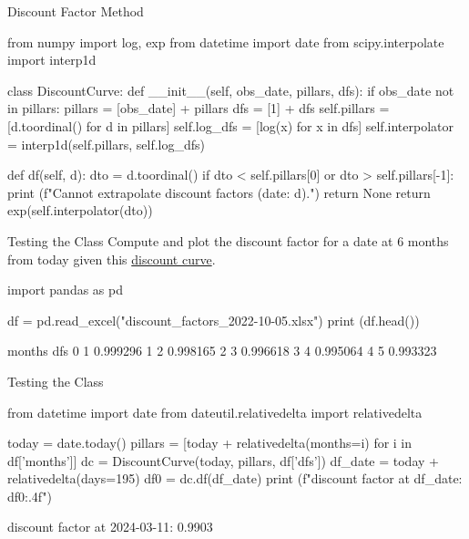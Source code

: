\documentclass{beamer}
\begin{document}
\begin{frame}[fragile]{Discount Factor Method}
\begin{ipython}
from numpy import log, exp
from datetime import date
from scipy.interpolate import interp1d  
	
class DiscountCurve:
    def __init__(self, obs_date, pillars, dfs):
        if obs_date not in pillars:
            pillars = [obs_date] + pillars
            dfs = [1] + dfs
        self.pillars = [d.toordinal() for d in pillars]
        self.log_dfs = [log(x) for x in dfs]
        self.interpolator = interp1d(self.pillars, self.log_dfs)
        
    def df(self, d):
        dto = d.toordinal()   
        if dto < self.pillars[0] or dto > self.pillars[-1]:
            print (f"Cannot extrapolate discount factors (date: {d}).")
            return None
        return exp(self.interpolator(dto))
\end{ipython}
\end{frame}

\begin{frame}[fragile]{Testing the Class}
Compute and plot the discount factor for a date at 6 months from today given this \href{https://github.com/matteosan1/finance_course/raw/develop/input_files/discount_factors_2022-10-05.xlsx}{discount curve}.
\begin{ipython}
import pandas as pd

df = pd.read_excel("discount_factors_2022-10-05.xlsx")
print (df.head())
\end{ipython}
\begin{ioutput}
   months       dfs
0       1  0.999296
1       2  0.998165
2       3  0.996618
3       4  0.995064
4       5  0.993323
\end{ioutput}
\end{frame}

\begin{frame}[fragile]{Testing the Class}
\begin{ipython}
from datetime import date
from dateutil.relativedelta import relativedelta

today = date.today()
pillars = [today + relativedelta(months=i) for i in df['months']]
dc = DiscountCurve(today, pillars, df['dfs'])
df_date = today + relativedelta(days=195)
df0 = dc.df(df_date)
print (f"discount factor at {df_date}: {df0:.4f}")
\end{ipython}
\begin{ioutput}
discount factor at 2024-03-11: 0.9903
\end{ioutput}
\end{frame}
\end{document}
